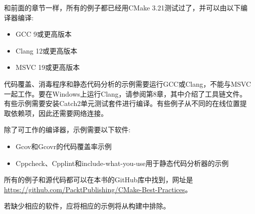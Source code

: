 和前面的章节一样，所有的例子都已经用CMake 3.21测试过了，并可以由以下编译器编译:

\begin{itemize}
\item 
GCC 9或更高版本

\item 
Clang 12或更高版本

\item 
MSVC 19或更高版本
\end{itemize}

代码覆盖、消毒程序和静态代码分析的示例需要运行GCC或Clang，不能与MSVC一起工作。要在Windows上运行Clang，请参阅第8章，其中介绍了工具链文件。有些示例需要安装Catch2单元测试套件进行编译。有些例子从不同的在线位置提取依赖项，因此还需要网络连接。 

除了可工作的编译器，示例需要以下软件:

\begin{itemize}
\item 
Gcov和Gcovr的代码覆盖率示例
	
\item 
Cppcheck、Cpplint和include-what-you-use用于静态代码分析器的示例
\end{itemize}

所有的例子和源代码都可以在本书的GitHub库中找到，网址是\url{https://github.com/PacktPublishing/CMake-Best-Practices}。 

若缺少相应的软件，应将相应的示例将从构建中排除。






























